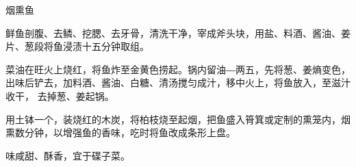 \begin{recipe}{烟熏鱼}

\ingredients


\preparation

\step 鲜鱼剖腹、去鳞、挖腮、去牙骨，清洗干净，宰成斧头块，用盐、料酒、酱油、姜
片、葱段将鱼浸渍十五分钟取组。

\step 菜油在旺火上烧红，将鱼炸至金黄色捞起。锅内留油―两五，先将葱、姜熵变色，
出味后铲去，加料酒、酱油、白糖、清汤搅匀成汁，移中火上，将鱼放入，至滋汁收干，
去掉葱、姜起锅。

\step 用土钵一个，装烧红的木炭，将柏枝烧至起烟，把鱼盛入筲箕或定制的熏笼内，烟
熏数分钟，以增强鱼的香味，吃时将鱼改成条形上盘。

\features

味咸甜、酥香，宜于碟子菜。

\end{recipe}

